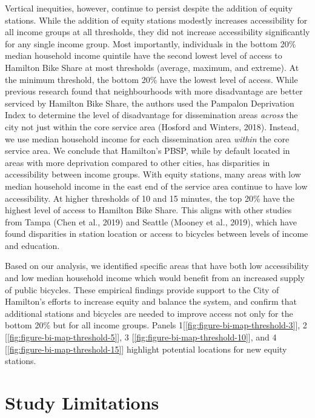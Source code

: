\documentclass[]{elsarticle} %
\begin{document}
Vertical inequities, however, continue to persist despite the addition
of equity stations. While the addition of equity stations modestly
increases accessibility for all income groups at all thresholds, they
did not increase accessibility significantly for any single income
group. Most importantly, individuals in the bottom 20\% median household
income quintile have the second lowest level of access to Hamilton Bike
Share at most thresholds (average, maximum, and extreme). At the minimum
threshold, the bottom 20\% have the lowest level of access. While
previous research found that neighbourhoods with more disadvantage are
better serviced by Hamilton Bike Share, the authors used the Pampalon
Deprivation Index to determine the level of disadvantage for
dissemination areas \emph{across} the city not just within the core
service area (Hosford and Winters, 2018). Instead, we use median
household income for each dissemination area \emph{within} the core
service area. We conclude that Hamilton's PBSP, while by default located
in areas with more deprivation compared to other cities, has disparities
in accessibility between income groups. With equity stations, many areas
with low median household income in the east end of the service area
continue to have low accessibility. At higher thresholds of 10 and 15
minutes, the top 20\% have the highest level of access to Hamilton Bike
Share. This aligns with other studies from Tampa (Chen et al., 2019) and
Seattle (Mooney et al., 2019), which have found disparities in station
location or access to bicycles between levels of income and education.

Based on our analysis, we identified specific areas that have both low
accessibility and low median household income which would benefit from
an increased supply of public bicycles. These empirical findings provide
support to the City of Hamilton's efforts to increase equity and balance
the system, and confirm that additional stations and bicycles are needed
to improve access not only for the bottom 20\% but for all income
groups. Panels 1{[}\ref{fig:figure-bi-map-threshold-3}{]}, 2
{[}\ref{fig:figure-bi-map-threshold-5}{]}, 3
{[}\ref{fig:figure-bi-map-threshold-10}{]}, and 4
{[}\ref{fig:figure-bi-map-threshold-15}{]} highlight potential locations
for new equity stations.

\hypertarget{study-limitations}{%
\section{Study Limitations}\label{study-limitations}}
\end{document}
